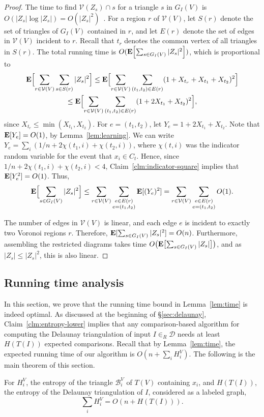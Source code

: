 \documentclass{siamltex}
\newcommand{\D}{\mathcal{D}}
\newcommand{\cV}{\mathcal{V}}
\newcommand{\EX}{\hbox{\bf E}}
\newcommand{\tsearch}{\mathcal{B}}
\begin{document}
\begin{proof}
The time to find $\cV(Z_s) \cap s$ for a triangle 
$s$  in $G_I(V)$ is 
$O(|Z_s|\log |Z_s|) = O(|Z_s|^2)$~\cite[Chapter~7]{deBergKrOvSc00}. 
For a region $r$ of 
$\cV(V)$, let $S(r)$ denote the set of triangles of $G_I(V)$ contained
in $r$, and let $E(r)$ denote the set of edges in $\cV(V)$ 
incident to $r$. 
Recall that $t_r$ denotes the common vertex of all triangles in
$S(r)$. The total running time is
$O(\EX\Bigl[\sum_{s \in G_I(V)} |Z_s|^2\Bigr])$, which is
proportional to
\begin{multline*}
\EX\Bigl[\sum_{r \in \cV(V)} \sum_{s \in S(r)} |Z_s|^2\Bigr] 
\leq \EX\Bigl[\sum_{r \in \cV(V)} \sum_{
(t_1,t_2) \in E(r)}
(1+X_{t_r} + X_{t_1} + X_{t_2})^2\Bigr]\\
\leq \EX\Bigl[\sum_{r \in \cV(V)} 
\sum_{(t_1, t_2) \in E(r)} 
(1+2X_{t_1} + X_{t_2})^2\Bigr],
\end{multline*}
since $X_{t_r} \leq \min(X_{t_1}, X_{t_2})$. 
For $e = (t_1,t_2)$, let $Y_e = 1+2X_{t_1} + X_{t_2}$.
Note that $\EX[Y_e] = O(1)$, by Lemma~\ref{lem:learning}.
We can write $Y_e = \sum_{i} (1/n + 2\chi(t_1,i) + \chi(t_2,i))$,
where $\chi(t,i)$ was the indicator random variable for the event
that $x_i \in C_t$.
Hence, since $1/n + 2\chi(t_1,i) + \chi(t_2,i) < 4$,
Claim~\ref{clm:indicator-square} implies that $\EX[Y_e^2] = O(1)$.
Thus,
\[
\EX\Bigl[\sum_{s \in G_I(V)} |Z_s|^2\Bigr]
\leq
\sum_{r \in \cV(V)} 
\sum_{\substack{e \in E(r) \\ e = (t_1, t_2)}} 
\EX[(Y_e)^2]
=\sum_{r \in \cV(V)} 
\sum_{\substack{e \in E(r) \\ e = (t_1, t_2)}} 
O(1).
\]


The number of edges in $\cV(V)$ is linear, and each edge $e$
is incident to exactly two Voronoi regions $r$.
Therefore, $\EX[\sum_{s \in G_I(V)} |Z_s|^2] = O(n)$.
Furthermore, assembling the restricted diagrams takes time 
$O\bigl(\EX\bigl[\sum_{s \in G_I(V)}|Z_s|\bigr]\bigr)$, and as
$|Z_s| \leq |Z_s|^2$, this is also linear.  
\end{proof}

\subsection{Running time analysis}\label{sec:running-time}

In this section, we prove that the running time bound
in Lemma~\ref{lem:time} is indeed optimal. As discussed 
at the beginning of \S\ref{sec:delaunay}, 
Claim~\ref{clm:entropy-lower} implies that any
comparison-based algorithm for computing the Delaunay
triangulation of input $I \in_R \D$ needs at least
$H(T(I))$ expected comparisons.
Recall that by Lemma~\ref{lem:time}, the expected running time 
of our algorithm is 
$O(n+\sum_i H^V_i)$.
The following is the main theorem of this section.
\medskip
\begin{theorem} \label{thm:main-entropy}
For $H^V_i$, the
entropy of the triangle $\tsearch_i^V$ of $T(V)$ containing $x_i$,
and $H(T(I))$, the entropy of the Delaunay triangulation of $I$,
considered as a labeled graph, 
\[ 
\sum_i H^V_i =  O(n + H(T(I))).
\]
\end{theorem}
\end{document}
